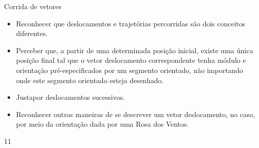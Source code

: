 \clearpage

\clearmargin
\begin{objectives}{Corrida de vetores}
{
\begin{itemize}
\item {} 
Reconhecer que deslocamentos e trajetórias percorridas são dois conceitos diferentes.

\item {} 
Perceber que, a partir de uma determinada posição inicial,  existe uma única posição final tal que o vetor deslocamento correspondente tenha módulo e orientação pré-especificados por um segmento orientado, não importando onde este segmento orientado esteja desenhado.

\item {} 
Justapor deslocamentos sucessivos.

\item {} 
Reconhecer outras maneiras de se descrever um vetor deslocamento, no caso, por meio da orientação dada por uma Rosa dos Ventos.

\end{itemize}
}{1}{1}
\end{objectives}
\marginpar{\vspace{-2em}}
